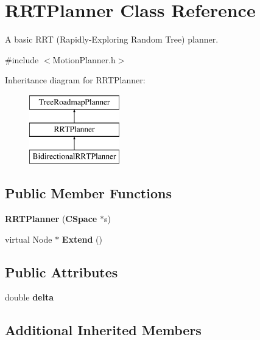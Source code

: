 \section{R\+R\+T\+Planner Class Reference}
\label{classRRTPlanner}


A basic R\+RT (Rapidly-\/\+Exploring Random Tree) planner.  




{\ttfamily \#include $<$Motion\+Planner.\+h$>$}

Inheritance diagram for R\+R\+T\+Planner\+:\begin{figure}[H]
\begin{center}
\leavevmode
\includegraphics[height=3.000000cm]{classRRTPlanner}
\end{center}
\end{figure}
\subsection*{Public Member Functions}
\begin{DoxyCompactItemize}
\item 
{\bfseries R\+R\+T\+Planner} ({\bf C\+Space} $\ast$s)\label{classRRTPlanner_a7e05739b70e094e8c8db2d4e59d88c7c}

\item 
virtual Node $\ast$ {\bfseries Extend} ()\label{classRRTPlanner_a60465eda37372c30a88fffbb89d6ef77}

\end{DoxyCompactItemize}
\subsection*{Public Attributes}
\begin{DoxyCompactItemize}
\item 
double {\bfseries delta}\label{classRRTPlanner_a4d715600295aebd1f18d29c4e9dee1bd}

\end{DoxyCompactItemize}
\subsection*{Additional Inherited Members}


